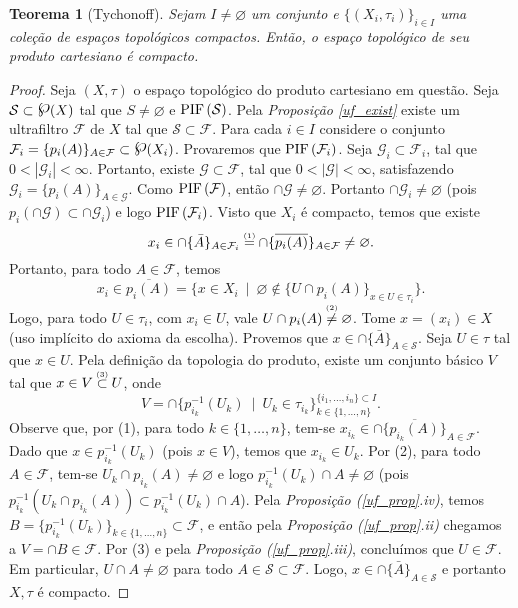 \documentclass{article}
\newtheorem{theorem}{Teorema}
\newcommand{\comment}[2]{\stackrel{\mathclap{\textnormal{\tiny\mbox{#2}}}}{#1}}
\newcommand{\powerset}{\raisebox{.15\baselineskip}{\Large\ensuremath{\wp}}}
\newcommand{\suchthat}{\enspace|\enspace}
\newcommand{\fip}[1]{\text{PIF\,}(#1)}
\begin{document}
\begin{theorem}[Tychonoff]
  Sejam \(I\neq\varnothing\) um conjunto e \(\{(X_i,\tau_i)\}_{i \in
    I}\) uma coleção de espaços topológicos compactos.  Então, o
  espaço topológico de seu produto cartesiano é compacto.
\end{theorem}

\begin{proof}
  Seja \((X,\tau)\) o espaço topológico do produto cartesiano em
  questão.  Seja \(\mathcal{S}\subset\powerset(X)\) tal que
  \(S\neq\varnothing\) e \(\fip{\mathcal{S}}\).  Pela
  \textit{Proposição \ref{uf_exist}} existe um ultrafiltro
  \(\mathcal{F}\) de \(X\) tal que \(\mathcal{S}\subset\mathcal{F}\).
  Para cada \(i \in I\) considere o conjunto
  \(\mathcal{F}_i=\{p_i(A)\}_{A\in\mathcal{F}}\subset\powerset(X_i)\).
  Provaremos que \(\fip{\mathcal{F}_i}\).  Seja \(\mathcal{G}_i
  \subset \mathcal{F}_i\), tal que \(0<|\mathcal{G}_i|<\infty\).
  Portanto, existe \(\mathcal{G} \subset \mathcal{F}\), tal que
  \(0<|\mathcal{G}|<\infty\), satisfazendo
  \(\mathcal{G}_i=\{p_i(A)\}_{A\in\mathcal{G}}\).  Como
  \(\fip{\mathcal{F}}\), então \(\cap\mathcal{G}\neq\varnothing\).
  Portanto \(\cap\mathcal{G}_i\neq\varnothing\) (pois
  \(p_i(\cap\mathcal{G}) \subset \cap\mathcal{G}_i\)) e logo
  \(\fip{\mathcal{F}_i}\).  Visto que \(X_i\) é compacto, temos que
  existe \[x_i\in\cap\{\bar{A}\}_{A\in \mathcal{F}_i} \comment{=}{(1)}
  \cap\{\overline{p_i(A)}\}_{A\in\mathcal{F}} \neq\varnothing.\]
  Portanto, para todo \(A\in\mathcal{F}\), temos \[x_i \in
  \overline{p_i(A)}=\{x\in X_i \suchthat \varnothing \notin \{U\cap
  p_i(A)\}_{x\in U\in \tau_i}\}.\] Logo, para todo \(U\in\tau_i\), com
  \(x_i\in U\), vale \(U\cap p_i(A)\comment{\neq}{(2)}\varnothing\).
  Tome \(x=(x_i)\in X\) (uso implícito do axioma da escolha).
  Provemos que \(x\in\cap\{\bar{A}\}_{A\in\mathcal{S}}\).  Seja
  \(U\in\tau\) tal que \(x\in U\).  Pela definição da topologia do
  produto, existe um conjunto básico \(V\) tal que \(x\in
  V\comment{\subset}{(3)} U\),
  onde \[V=\cap\{p_{i_k}^{-1}(U_k)\suchthat U_k \in
  \tau_{i_k}\}_{k\in\{1,\dots,n\}}^{\{i_1,\dots,i_n\}\subset I}.\]
  Observe que, por (1), para todo \(k \in \{1,\dots,n\}\), tem-se
  \(x_{i_k}\in\cap\{\overline{p_{i_k}(A)}\}_{A\in\mathcal{F}}\).  Dado
  que \(x\in p_{i_k}^{-1}(U_k)\) (pois \(x \in V\)), temos que
  \(x_{i_k}\in U_k\).  Por (2), para todo \(A\in\mathcal{F}\), tem-se
  \(U_k \cap p_{i_k}(A)\neq\varnothing\) e logo
  \(p_{i_k}^{-1}(U_k)\cap A\neq\varnothing\) (pois \(p_{i_k}^{-1}(U_k
  \cap p_{i_k}(A)) \subset p_{i_k}^{-1}(U_k)\cap A\)).  Pela
  \textit{Proposição (\ref{uf_prop}.iv)}, temos
  \(B=\{p_{i_k}^{-1}(U_k)\}_{k\in\{1,\dots,n\}}\subset\mathcal{F}\), e
  então pela \textit{Proposição (\ref{uf_prop}.ii)} chegamos a
  \(V=\cap B\in\mathcal{F}\).  Por (3) e pela \textit{Proposição
    (\ref{uf_prop}.iii)}, concluímos que \(U\in\mathcal{F}\).  Em
  particular, \(U\cap A\neq\varnothing\) para todo \(A\in
  \mathcal{S}\subset\mathcal{F}\).  Logo,
  \(x\in\cap\{\bar{A}\}_{A\in\mathcal{S}}\) e portanto \(X,\tau\) é
  compacto.
\end{proof}
\end{document}
